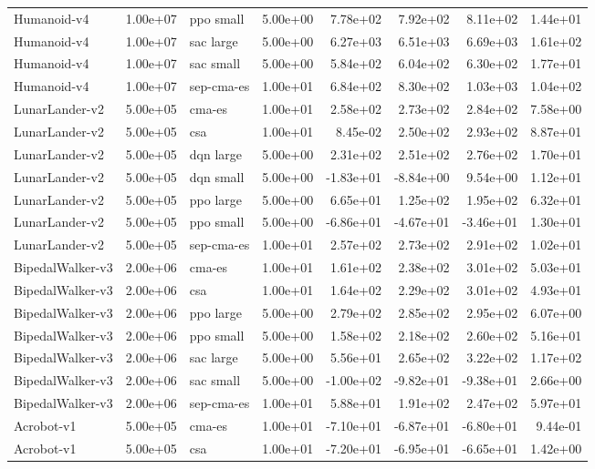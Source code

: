 \begin{longtable}{lrlrrrrr}
Humanoid-v4 & 1.00e+07 & ppo small & 5.00e+00 & 7.78e+02 & 7.92e+02 & 8.11e+02 & 1.44e+01 \\
Humanoid-v4 & 1.00e+07 & sac large & 5.00e+00 & 6.27e+03 & 6.51e+03 & 6.69e+03 & 1.61e+02 \\
Humanoid-v4 & 1.00e+07 & sac small & 5.00e+00 & 5.84e+02 & 6.04e+02 & 6.30e+02 & 1.77e+01 \\
Humanoid-v4 & 1.00e+07 & sep-cma-es & 1.00e+01 & 6.84e+02 & 8.30e+02 & 1.03e+03 & 1.04e+02 \\
LunarLander-v2 & 5.00e+05 & cma-es & 1.00e+01 & 2.58e+02 & 2.73e+02 & 2.84e+02 & 7.58e+00 \\
LunarLander-v2 & 5.00e+05 & csa & 1.00e+01 & 8.45e-02 & 2.50e+02 & 2.93e+02 & 8.87e+01 \\
LunarLander-v2 & 5.00e+05 & dqn large & 5.00e+00 & 2.31e+02 & 2.51e+02 & 2.76e+02 & 1.70e+01 \\
LunarLander-v2 & 5.00e+05 & dqn small & 5.00e+00 & -1.83e+01 & -8.84e+00 & 9.54e+00 & 1.12e+01 \\
LunarLander-v2 & 5.00e+05 & ppo large & 5.00e+00 & 6.65e+01 & 1.25e+02 & 1.95e+02 & 6.32e+01 \\
LunarLander-v2 & 5.00e+05 & ppo small & 5.00e+00 & -6.86e+01 & -4.67e+01 & -3.46e+01 & 1.30e+01 \\
LunarLander-v2 & 5.00e+05 & sep-cma-es & 1.00e+01 & 2.57e+02 & 2.73e+02 & 2.91e+02 & 1.02e+01 \\
BipedalWalker-v3 & 2.00e+06 & cma-es & 1.00e+01 & 1.61e+02 & 2.38e+02 & 3.01e+02 & 5.03e+01 \\
BipedalWalker-v3 & 2.00e+06 & csa & 1.00e+01 & 1.64e+02 & 2.29e+02 & 3.01e+02 & 4.93e+01 \\
BipedalWalker-v3 & 2.00e+06 & ppo large & 5.00e+00 & 2.79e+02 & 2.85e+02 & 2.95e+02 & 6.07e+00 \\
BipedalWalker-v3 & 2.00e+06 & ppo small & 5.00e+00 & 1.58e+02 & 2.18e+02 & 2.60e+02 & 5.16e+01 \\
BipedalWalker-v3 & 2.00e+06 & sac large & 5.00e+00 & 5.56e+01 & 2.65e+02 & 3.22e+02 & 1.17e+02 \\
BipedalWalker-v3 & 2.00e+06 & sac small & 5.00e+00 & -1.00e+02 & -9.82e+01 & -9.38e+01 & 2.66e+00 \\
BipedalWalker-v3 & 2.00e+06 & sep-cma-es & 1.00e+01 & 5.88e+01 & 1.91e+02 & 2.47e+02 & 5.97e+01 \\
Acrobot-v1 & 5.00e+05 & cma-es & 1.00e+01 & -7.10e+01 & -6.87e+01 & -6.80e+01 & 9.44e-01 \\
Acrobot-v1 & 5.00e+05 & csa & 1.00e+01 & -7.20e+01 & -6.95e+01 & -6.65e+01 & 1.42e+00 \\

\end{longtable}
